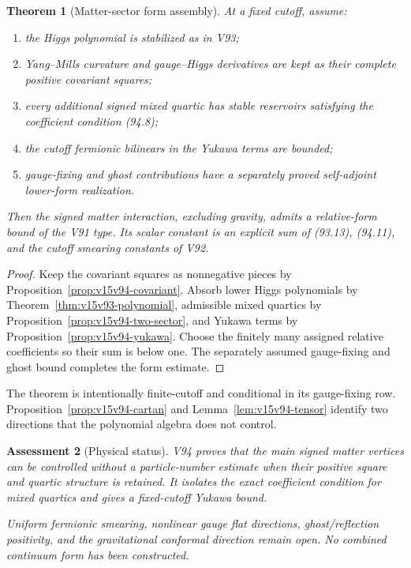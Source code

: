 \documentclass[11pt]{article}
\newtheorem{theorem}{Theorem}[section]
\newtheorem{assessment}[theorem]{Assessment}
\theoremstyle{remark}
\begin{document}
\begin{theorem}[Matter-sector form assembly]
\label{thm:v15v94-assembly}
At a fixed cutoff, assume:
\begin{enumerate}
\item the Higgs polynomial is stabilized as in V93;
\item Yang--Mills curvature and gauge--Higgs derivatives are kept
      as their complete positive covariant squares;
\item every additional signed mixed quartic has stable reservoirs
      satisfying the coefficient condition (94.8);
\item the cutoff fermionic bilinears in the Yukawa terms are bounded;
\item gauge-fixing and ghost contributions have a separately proved
      self-adjoint lower-form realization.
\end{enumerate}
Then the signed matter interaction, excluding gravity, admits a
relative-form bound of the V91 type.  Its scalar constant is an
explicit sum of (93.13), (94.11), and the cutoff smearing constants
of V92.
\end{theorem}

\begin{proof}
Keep the covariant squares as nonnegative pieces by
Proposition~\ref{prop:v15v94-covariant}.  Absorb lower Higgs
polynomials by Theorem~\ref{thm:v15v93-polynomial}, admissible mixed
quartics by Proposition~\ref{prop:v15v94-two-sector}, and Yukawa
terms by Proposition~\ref{prop:v15v94-yukawa}.  Choose the finitely
many assigned relative coefficients so their sum is below one.
The separately assumed gauge-fixing and ghost bound completes the
form estimate.
\end{proof}

The theorem is intentionally finite-cutoff and conditional in its
gauge-fixing row.  Proposition~\ref{prop:v15v94-cartan} and
Lemma~\ref{lem:v15v94-tensor} identify two directions that the
polynomial algebra does not control.

\begin{assessment}[Physical status]
\label{ass:v15v94-status}
V94 proves that the main signed matter vertices can be controlled
without a particle-number estimate when their positive square and
quartic structure is retained.  It isolates the exact coefficient
condition for mixed quartics and gives a fixed-cutoff Yukawa bound.

Uniform fermionic smearing, nonlinear gauge flat directions,
ghost/reflection positivity, and the gravitational conformal
direction remain open.  No combined continuum form has been
constructed.
\end{assessment}
\end{document}
